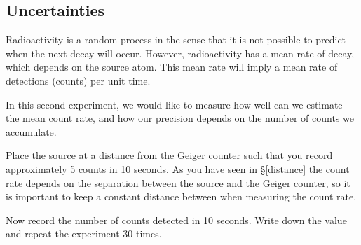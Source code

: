 \subsection{Uncertainties}

Radioactivity is a random process in the sense that it is not possible to predict when the next decay will occur. However, radioactivity has a mean rate of decay, which depends on the source atom. This mean rate will imply a mean rate of detections (counts) per unit time.

In this second experiment, we would like to measure how well can we estimate the mean count rate, and how our precision depends on the number of counts we accumulate.

Place the source at a distance from the Geiger counter such that you record approximately 5 counts in 10 seconds. As you have seen in \S \ref{distance} the count rate depends on the separation between the source and the Geiger counter, so it is important to keep a constant distance between when measuring the count rate.

Now record the number of counts detected in 10 seconds. Write down the value and repeat the experiment 30 times.